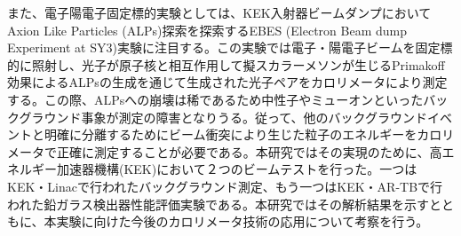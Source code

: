   また、電子陽電子固定標的実験としては、KEK入射器ビームダンプにおいてAxion Like Particles (ALPs)探索を探索するEBES (Electron Beam dump Experiment at SY3)実験に注目する。この実験では電子・陽電子ビームを固定標的に照射し、光子が原子核と相互作用して擬スカラーメソンが生じるPrimakoff効果によるALPsの生成を通じて生成された光子ペアをカロリメータにより測定する。この際、ALPsへの崩壊は稀であるため中性子やミューオンといったバックグラウンド事象が測定の障害となりうる。従って、他のバックグラウンドイベントと明確に分離するためにビーム衝突により生じた粒子のエネルギーをカロリメータで正確に測定することが必要である。本研究ではその実現のために、高エネルギー加速器機構(KEK)において２つのビームテストを行った。一つはKEK・Linacで行われたバックグラウンド測定、もう一つはKEK・AR-TBで行われた鉛ガラス検出器性能評価実験である。本研究ではその解析結果を示すとともに、本実験に向けた今後のカロリメータ技術の応用について考察を行う。
 



